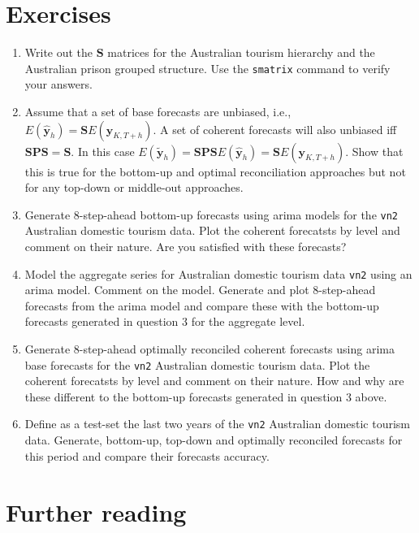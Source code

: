 \documentclass[]{book}
\begin{document}
\hypertarget{ex:hierarchical}{%
\section{Exercises}\label{ex:hierarchical}}

\begin{enumerate}
\def\labelenumi{\arabic{enumi}.}
\item
  Write out the \(\bm{S}\) matrices for the Australian tourism hierarchy and the Australian prison grouped structure. Use the \texttt{smatrix} command to verify your answers.
\item
  Assume that a set of base forecasts are unbiased, i.e., \(E(\hat{\bm{y}}_h)=\bm{S}E(\bm{y}_{K,T+h})\). A set of coherent forecasts will also unbiased iff \(\bm{S}\bm{P}\bm{S}=\bm{S}\). In this case \(E(\tilde{\bm{y}}_h)=\bm{S}\bm{P}\bm{S}E(\hat{\bm{y}}_h)=\bm{S}E(\bm{y}_{K,T+h})\). Show that this is true for the bottom-up and optimal reconciliation approaches but not for any top-down or middle-out approaches.
\item
  Generate 8-step-ahead bottom-up forecasts using arima models for the \texttt{vn2} Australian domestic tourism data. Plot the coherent forecatsts by level and comment on their nature. Are you satisfied with these forecasts?
\item
  Model the aggregate series for Australian domestic tourism data \texttt{vn2} using an arima model. Comment on the model. Generate and plot 8-step-ahead forecasts from the arima model and compare these with the bottom-up forecasts generated in question 3 for the aggregate level.
\item
  Generate 8-step-ahead optimally reconciled coherent forecasts using arima base forecasts for the \texttt{vn2} Australian domestic tourism data. Plot the coherent forecatsts by level and comment on their nature. How and why are these different to the bottom-up forecasts generated in question 3 above.
\item
  Define as a test-set the last two years of the \texttt{vn2} Australian domestic tourism data. Generate, bottom-up, top-down and optimally reconciled forecasts for this period and compare their forecasts accuracy.
\end{enumerate}

\hypertarget{further-reading-7}{%
\section{Further reading}\label{further-reading-7}}
\end{document}
